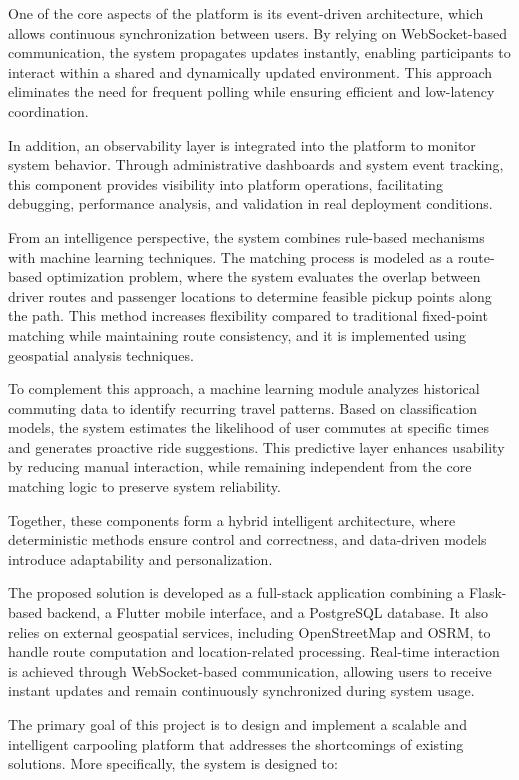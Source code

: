 One of the core aspects of the platform is its event-driven architecture, which allows continuous synchronization between users. By relying on WebSocket-based communication, the system propagates updates instantly, enabling participants to interact within a shared and dynamically updated environment. This approach eliminates the need for frequent polling while ensuring efficient and low-latency coordination.

In addition, an observability layer is integrated into the platform to monitor system behavior. Through administrative dashboards and system event tracking, this component provides visibility into platform operations, facilitating debugging, performance analysis, and validation in real deployment conditions.

From an intelligence perspective, the system combines rule-based mechanisms with machine learning techniques. The matching process is modeled as a route-based optimization problem, where the system evaluates the overlap between driver routes and passenger locations to determine feasible pickup points along the path. This method increases flexibility compared to traditional fixed-point matching while maintaining route consistency, and it is implemented using geospatial analysis techniques.

To complement this approach, a machine learning module analyzes historical commuting data to identify recurring travel patterns. Based on classification models, the system estimates the likelihood of user commutes at specific times and generates proactive ride suggestions. This predictive layer enhances usability by reducing manual interaction, while remaining independent from the core matching logic to preserve system reliability.

Together, these components form a hybrid intelligent architecture, where deterministic methods ensure control and correctness, and data-driven models introduce adaptability and personalization.

The proposed solution is developed as a full-stack application combining a Flask-based backend, a Flutter mobile interface, and a PostgreSQL database. It also relies on external geospatial services, including OpenStreetMap and OSRM, to handle route computation and location-related processing. Real-time interaction is achieved through WebSocket-based communication, allowing users to receive instant updates and remain continuously synchronized during system usage.

The primary goal of this project is to design and implement a scalable and intelligent carpooling platform that addresses the shortcomings of existing solutions. More specifically, the system is designed to:


